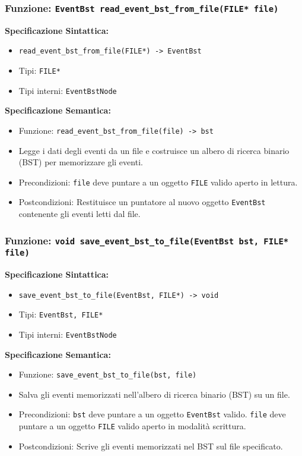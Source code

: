 \documentclass[11pt]{scrartcl} %
\begin{document}
\subsubsection{Funzione: \texttt{EventBst read\_event\_bst\_from\_file(FILE* file)}}

\textbf{Specificazione Sintattica:}
\begin{itemize}
\item \texttt{read\_event\_bst\_from\_file(FILE*) -> EventBst}
\item Tipi: \texttt{FILE*}
\item Tipi interni: \texttt{EventBstNode}
\end{itemize}

\textbf{Specificazione Semantica:}
\begin{itemize}
\item Funzione: \texttt{read\_event\_bst\_from\_file(file) -> bst}
\item Legge i dati degli eventi da un file e costruisce un albero di ricerca binario (BST) per memorizzare gli eventi.
\item Precondizioni: \texttt{file} deve puntare a un oggetto \texttt{FILE} valido aperto in lettura.
\item Postcondizioni: Restituisce un puntatore al nuovo oggetto
\texttt{EventBst} contenente gli eventi letti dal file.
\end{itemize}

\subsubsection{Funzione: \texttt{void save\_event\_bst\_to\_file(EventBst bst, FILE* file)}}

\textbf{Specificazione Sintattica:}
\begin{itemize}
\item \texttt{save\_event\_bst\_to\_file(EventBst, FILE*) -> void}
\item Tipi: \texttt{EventBst, FILE*}
\item Tipi interni: \texttt{EventBstNode}
\end{itemize}

\textbf{Specificazione Semantica:}
\begin{itemize}
\item Funzione: \texttt{save\_event\_bst\_to\_file(bst, file)}
\item Salva gli eventi memorizzati nell'albero di ricerca binario (BST) su un file.
\item Precondizioni: \texttt{bst} deve puntare a un oggetto \texttt{EventBst} valido. \texttt{file} deve puntare a un oggetto \texttt{FILE} valido aperto in modalità scrittura.
\item Postcondizioni: Scrive gli eventi memorizzati nel BST sul file specificato.
\end{itemize}
\end{document}
